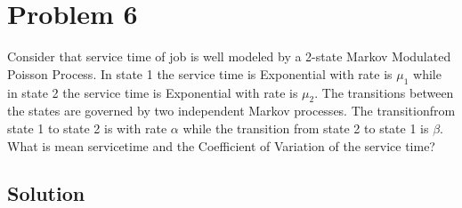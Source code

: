 \section*{Problem 6}

Consider that service time of job is well modeled by a 2-state Markov Modulated Poisson Process.
In state 1 the service time is Exponential with rate is $\mu_1$ while in state 2 the service time is Exponential with rate is $\mu_2$.
The transitions between the states are governed by two independent Markov processes.
The transitionfrom state 1 to state 2 is with rate $\alpha$ while the transition from state 2 to state 1 is $\beta$.
What is mean servicetime and the Coefficient of Variation of the service time?

\subsection*{Solution}
